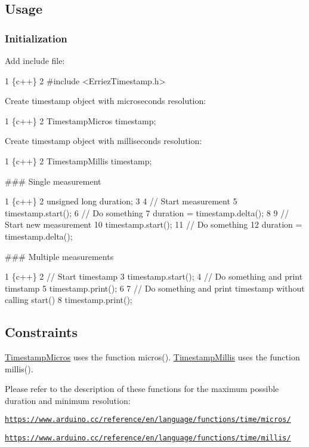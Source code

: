 \subsection*{Usage}

\subsubsection*{Initialization}

Add include file\+: 
\begin{DoxyCode}
1 \{c++\}
2 #include <ErriezTimestamp.h>
\end{DoxyCode}


Create timestamp object with microseconds resolution\+: 
\begin{DoxyCode}
1 \{c++\}
2 TimestampMicros timestamp;
\end{DoxyCode}


Create timestamp object with milliseconds resolution\+: 
\begin{DoxyCode}
1 \{c++\}
2 TimestampMillis timestamp;
\end{DoxyCode}


\#\#\# Single measurement 
\begin{DoxyCode}
1 \{c++\}
2 unsigned long duration;
3 
4 // Start measurement
5 timestamp.start();
6 // Do something
7 duration = timestamp.delta();
8 
9 // Start new measurement
10 timestamp.start();
11 // Do something
12 duration = timestamp.delta();
\end{DoxyCode}


\#\#\# Multiple measurements 
\begin{DoxyCode}
1 \{c++\}
2 // Start timestamp
3 timestamp.start();
4 // Do something and print timstamp
5 timestamp.print();
6 
7 // Do something and print timestamp without calling start()
8 timestamp.print();
\end{DoxyCode}


\subsection*{Constraints}

\hyperlink{class_timestamp_micros}{Timestamp\+Micros} uses the function {\ttfamily micros()}. \hyperlink{class_timestamp_millis}{Timestamp\+Millis} uses the function {\ttfamily millis()}.

Please refer to the description of these functions for the maximum possible duration and minimum resolution\+:


\begin{DoxyItemize}
\item \href{https://www.arduino.cc/reference/en/language/functions/time/micros/}{\tt https\+://www.\+arduino.\+cc/reference/en/language/functions/time/micros/}
\item \href{https://www.arduino.cc/reference/en/language/functions/time/millis/}{\tt https\+://www.\+arduino.\+cc/reference/en/language/functions/time/millis/}
\end{DoxyItemize}

